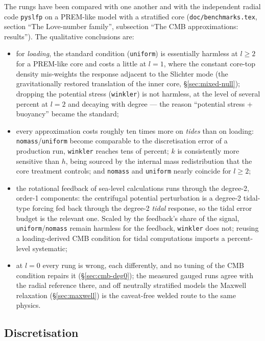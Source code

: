 \documentclass[11pt]{article}
\numberwithin{equation}{section}
\theoremstyle{remark}
\newcommand{\code}[1]{\texttt{#1}}
\begin{document}
The rungs have been compared with one another and with the independent
radial code \code{pyslfp} on a PREM-like model with a stratified core
(\code{doc/benchmarks.tex}, section ``The Love-number family'', subsection
``The CMB approximations: results''). The qualitative conclusions are:
\begin{itemize}
\item for \emph{loading}, the standard condition (\code{uniform}) is
  essentially harmless at $l\ge2$ for a PREM-like core and costs a little
  at $l=1$, where the constant core-top density mis-weights the response
  adjacent to the Slichter mode (the gravitationally restored translation
  of the inner core, \S\ref{sec:mixed-null}); dropping the potential
  stress (\code{winkler}) is not harmless, at the level of several percent
  at $l=2$ and decaying with degree --- the reason ``potential stress +
  buoyancy'' became the standard;
\item every approximation costs roughly ten times more on \emph{tides} than
  on loading: \code{nomass}/\code{uniform} become comparable to the
  discretisation error of a production run, \code{winkler} reaches tens of
  percent; $k$ is consistently more sensitive than $h$, being sourced by
  the internal mass redistribution that the core treatment controls; and
  \code{nomass} and \code{uniform} nearly coincide for $l\ge2$;
\item the rotational feedback of sea-level calculations runs through the
  degree-2, order-1 components: the centrifugal potential perturbation is a
  degree-2 tidal-type forcing fed back through the degree-2 \emph{tidal}
  response, so the tidal error budget is the relevant one. Scaled by the
  feedback's share of the signal, \code{uniform}/\code{nomass} remain
  harmless for the feedback, \code{winkler} does not; reusing a
  loading-derived CMB condition for tidal computations imports a
  percent-level systematic;
\item at $l=0$ every rung is wrong, each differently, and no tuning of
  the CMB condition repairs it (\S\ref{sec:cmb-deg0}); the measured gauged
  runs agree with the radial reference there, and off neutrally
  stratified models the Maxwell relaxation (\S\ref{sec:maxwell}) is the
  caveat-free welded route to the same physics.
\end{itemize}

\subsection{Discretisation}
\end{document}
